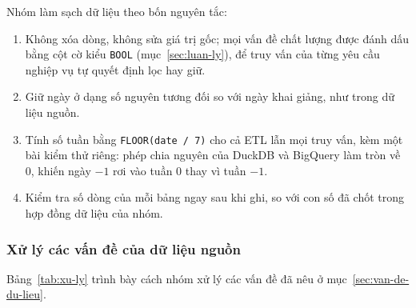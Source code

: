 Nhóm làm sạch dữ liệu theo bốn nguyên tắc:
\begin{enumerate}
  \item Không xóa dòng, không sửa giá trị gốc; mọi vấn đề chất lượng được đánh dấu bằng cột cờ
        kiểu \texttt{BOOL} (mục~\ref{sec:luan-ly}), để truy vấn của từng yêu cầu nghiệp vụ tự
        quyết định lọc hay giữ.
  \item Giữ ngày ở dạng số nguyên tương đối so với ngày khai giảng, như trong dữ liệu nguồn.
  \item Tính số tuần bằng \texttt{FLOOR(date / 7)} cho cả ETL lẫn mọi truy vấn, kèm một bài kiểm
        thử riêng: phép chia nguyên của DuckDB và BigQuery làm tròn về 0, khiến ngày $-1$ rơi vào
        tuần 0 thay vì tuần $-1$.
  \item Kiểm tra số dòng của mỗi bảng ngay sau khi ghi, so với con số đã chốt trong hợp đồng dữ
        liệu của nhóm.
\end{enumerate}

\subsubsection{Xử lý các vấn đề của dữ liệu nguồn}

Bảng~\ref{tab:xu-ly} trình bày cách nhóm xử lý các vấn đề đã nêu ở mục~\ref{sec:van-de-du-lieu}.


